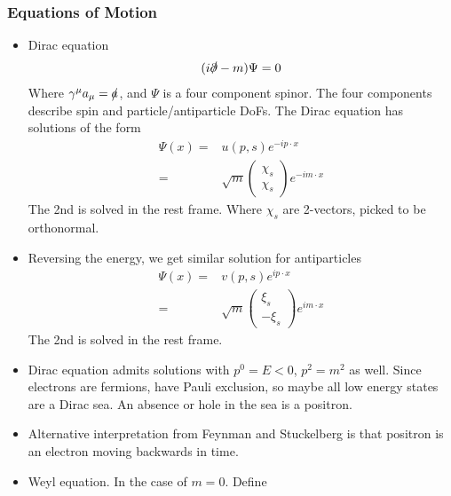 \subsubsection{Equations of Motion}
\begin{itemize}
    \item Dirac equation \cite{wells}
        \begin{equation} %
        \begin{split}
            (i\slashed{\partial}-m)\Psi=0
        \end{split}
        \end{equation}
        Where $\gamma^\mu a_\mu=\slashed{a}$, and $\Psi$ is a four component spinor. The four components describe spin and particle/antiparticle DoFs. The Dirac equation has solutions of the form
        \begin{equation}\begin{split}
        \Psi(x)=&u(p,s)e^{-ip\cdot x} \\
               =&\sqrt{m}\begin{pmatrix}\chi_s\\\chi_s\end{pmatrix}e^{-im\cdot x}
        \end{split}\end{equation}
        The 2nd is solved in the rest frame. Where $\chi_s$ are 2-vectors, picked to be orthonormal.
    \item Reversing the energy, we get similar solution for antiparticles \cite{wells}
        \begin{equation}\begin{split}
        \Psi(x)=&v(p,s)e^{ip\cdot x} \\
               =&\sqrt{m}\begin{pmatrix}\xi_s\\-\xi_s\end{pmatrix}e^{im\cdot x}
        \end{split}\end{equation}
        The 2nd is solved in the rest frame.
    \item Dirac equation admits solutions with $p^0=E<0$, $p^2=m^2$ as well. Since electrons are fermions, have Pauli exclusion, so maybe all low energy states are a Dirac sea. An absence or hole in the sea is a positron. \cite{wells}
    \item Alternative interpretation from Feynman and Stuckelberg is that positron is an electron moving backwards in time. \cite{wells}
    \item Weyl equation. In the case of $m=0$. Define \cite{wells}

\end{itemize}
